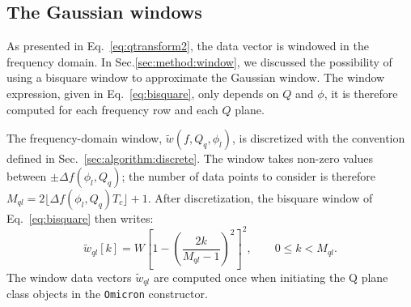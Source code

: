 \subsection{The Gaussian windows} \label{sec:algorithm:window}
As presented in Eq.~\ref{eq:qtransform2}, the data vector is windowed in the frequency domain. In Sec.\ref{sec:method:window}, we discussed the possibility of using a bisquare window to approximate the Gaussian window. The window expression, given in Eq.~\ref{eq:bisquare}, only depends on $Q$ and $\phi$, it is therefore computed for each frequency row and each $Q$ plane.

The frequency-domain window, $\tilde{w}(f,Q_q, \phi_l)$, is discretized with the convention defined in Sec.~\ref{sec:algorithm:discrete}. The window takes non-zero values between $\pm \Delta f(\phi_l,Q_q)$; the number of data points to consider is therefore $M_{ql}=2\lfloor \Delta f(\phi_l,Q_q) T_c \rfloor + 1$. After discretization, the bisquare window of Eq.~\ref{eq:bisquare} then writes:
\begin{equation}
  \tilde{w}_{ql}[k] = W \left[1 - \left(\frac{2k}{M_{ql}-1}\right)^2 \right]^2, \qquad 0\le k < M_{ql}.
  \label{eq:dbisquare}
\end{equation}
The window data vectors $\tilde{w}_{ql}$ are computed once when initiating the Q plane class objects in the \texttt{Omicron} constructor.




